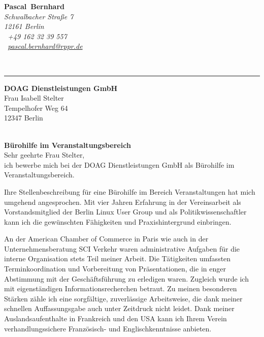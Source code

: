 \documentclass[11pt,a4paper]{article}
\def\firstname{Pascal}
\def\familyname{Bernhard}
\begin{document}
\sffamily   %
\hfill%
\begin{minipage}[t]{.6\textwidth}
	\raggedleft%
	{\bfseries {\color{firstnamecolor}\firstname}~{\color{familynamecolor}\familyname}}\\[.35ex]
	\small\itshape%
	Schwalbacher Straße 7\\
	12161 Berlin\\[.35ex]
	\Mobilefone~+49 162 32 39 557 \\
	\Letter~\href{mailto:pascal.bernhard@rppr.de}{pascal.bernhard@rppr.de}
\end{minipage}\\[0.5em]
%
{\color{firstnamecolor}\rule{\textwidth}{.25ex}}
%
\begin{minipage}[t]{.4\textwidth}
	\raggedright%
	\vspace*{1em}
	\textbf{DOAG Dienstleistungen GmbH} \\[.35ex]
	
		Frau Isabell Stelter\\
	\small%
	Tempelhofer Weg 64\\
	12347 Berlin
\end{minipage}
%
\hfill
%
\begin{minipage}[t]{.4\textwidth}
	\raggedleft %
\end{minipage}\\[1em]


{\bfseries \color{familynamecolor}Bürohilfe im Veranstaltungsbereich}\\[0.75em]

Sehr geehrte Frau Stelter,\\[0.5em]
%
ich bewerbe mich bei der DOAG Dienstleistungen GmbH als Bürohilfe im Veranstaltungsbereich.

Ihre Stellenbeschreibung für eine Bürohilfe im Bereich Veranstaltungen hat mich umgehend angesprochen. Mit vier Jahren Erfahrung in der Vereinsarbeit als Vorstandsmitglied der Berlin Linux User Group und als Politikwissenschaftler kann ich die gewünschten Fähigkeiten und Praxishintergrund einbringen.

An der American Chamber of Commerce in Paris wie auch in der Unternehmensberatung SCI Verkehr waren administrative Aufgaben für die interne Organisation stets Teil meiner Arbeit. Die Tätigkeiten umfassten Terminkoordination und Vorbereitung von Präsentationen, die in enger Abstimmung mit der Geschäftsführung zu erledigen waren. Zugleich wurde ich mit eigenständigen Informationsrecherchen betraut. Zu meinen besonderen Stärken zähle ich eine sorgfältige, zuverlässige Arbeitsweise, die dank meiner schnellen Auffassungsgabe auch unter Zeitdruck nicht leidet. Dank meiner Auslandsaufenthalte in Frankreich und den USA kann ich Ihrem Verein verhandlungssichere Französisch- und Englischkenntnisse anbieten.
\end{document}
